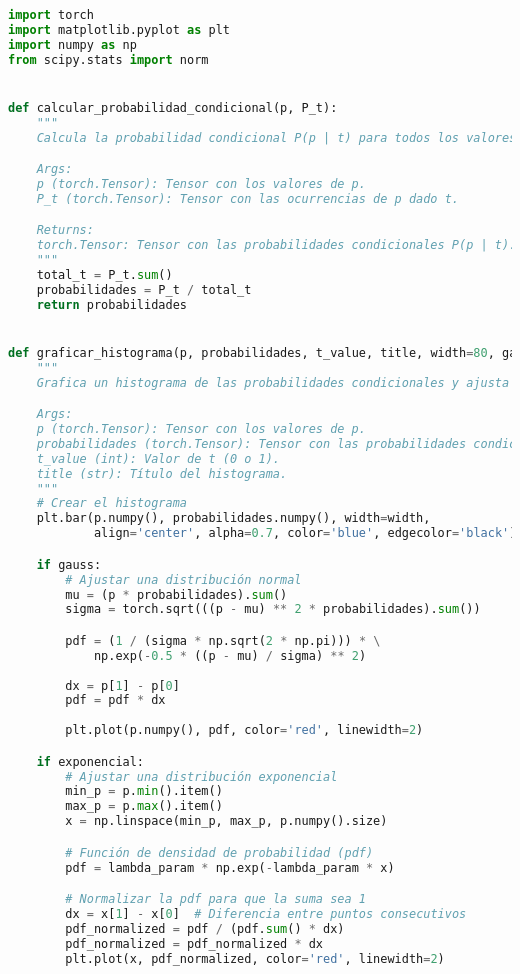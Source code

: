 \documentclass[spanish]{article}
\begin{document}
\begin{lstlisting}[language=Python, caption=Implementación de Funciones]
import torch
import matplotlib.pyplot as plt
import numpy as np
from scipy.stats import norm


def calcular_probabilidad_condicional(p, P_t):
    """
    Calcula la probabilidad condicional P(p | t) para todos los valores de p dado t.

    Args:
    p (torch.Tensor): Tensor con los valores de p.
    P_t (torch.Tensor): Tensor con las ocurrencias de p dado t.

    Returns:
    torch.Tensor: Tensor con las probabilidades condicionales P(p | t).
    """
    total_t = P_t.sum()
    probabilidades = P_t / total_t
    return probabilidades


def graficar_histograma(p, probabilidades, t_value, title, width=80, gauss=False, exponencial=False, lambda_param=0.5):
    """
    Grafica un histograma de las probabilidades condicionales y ajusta una distribución normal.

    Args:
    p (torch.Tensor): Tensor con los valores de p.
    probabilidades (torch.Tensor): Tensor con las probabilidades condicionales.
    t_value (int): Valor de t (0 o 1).
    title (str): Título del histograma.
    """
    # Crear el histograma
    plt.bar(p.numpy(), probabilidades.numpy(), width=width,
            align='center', alpha=0.7, color='blue', edgecolor='black')

    if gauss:
        # Ajustar una distribución normal
        mu = (p * probabilidades).sum()
        sigma = torch.sqrt(((p - mu) ** 2 * probabilidades).sum())

        pdf = (1 / (sigma * np.sqrt(2 * np.pi))) * \
            np.exp(-0.5 * ((p - mu) / sigma) ** 2)
        
        dx = p[1] - p[0]
        pdf = pdf * dx
        
        plt.plot(p.numpy(), pdf, color='red', linewidth=2)

    if exponencial:
        # Ajustar una distribución exponencial
        min_p = p.min().item()
        max_p = p.max().item()
        x = np.linspace(min_p, max_p, p.numpy().size)

        # Función de densidad de probabilidad (pdf)
        pdf = lambda_param * np.exp(-lambda_param * x)

        # Normalizar la pdf para que la suma sea 1
        dx = x[1] - x[0]  # Diferencia entre puntos consecutivos
        pdf_normalized = pdf / (pdf.sum() * dx)
        pdf_normalized = pdf_normalized * dx
        plt.plot(x, pdf_normalized, color='red', linewidth=2)



\end{lstlisting}
\end{document}
